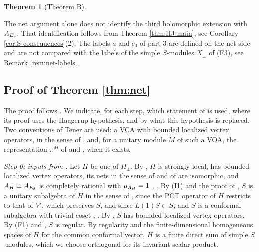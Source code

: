 \documentclass[leqno]{article}
\let\cal\relax
\newcommand{\cal}{\mathcal}
\newtheorem{thm}{Theorem}[section]
\numberwithin{equation}{section}
\begin{document}
\begin{thm}[Theorem B]
\begin{enumerate}
\end{enumerate}
\end{thm}

The net argument alone does not identify the third holomorphic extension with $\cal A_{E_8}$. That identification follows from Theorem \ref{thm:HJ-main}, see Corollary \ref{cor:S-consequences}(2). The labels $a$ and $c_0$ of part 3 are defined on the net side and are not compared with the labels of the simple $S$-modules $X_\pm$ of (F3), see Remark \ref{rem:net-labels}.


\subsection{Proof of Theorem \ref{thm:net}}

The proof follows \cite[Sections 5--7]{ArhII}. We indicate, for each step, which statement of \cite{ArhII} is used, where its proof uses the Haagerup hypothesis, and by what this hypothesis is replaced. Two conventions of Tener are used: a VOA with bounded localized vertex operators, in the sense of \cite[Definition 4.12 p.~42]{Ten19}, and, for a unitary module $M$ of such a VOA, the representation $\pi^M$ of \cite[Definition 5.1 p.~49]{Ten19} and \cite[Definition 2.18 p.~20]{Ten24}, when it exists.

\emph{Step 0: inputs from \cite[Section 4]{ArhII}.} Let $H$ be one of $H_\pm$. By \cite[Proposition 4.3(1)]{ArhII}, $H$ is strongly local, has bounded localized vertex operators, its nets in the sense of \cite{Ten19} and of \cite{CKLW18} are isomorphic, and $\cal A_H \cong \cal A_{E_8}$ is completely rational with $\mu_{\cal A_H} = 1$ \cite[Theorem 7.4 p.~71, Proposition 7.5 and Corollary 7.7 p.~72]{Ten19}, \cite[Corollary 3.19]{DoX06}. By (I1) and the proof of \cite[Theorem 4.5]{ArhII}, $S$ is a unitary subalgebra of $H$ in the sense of \cite[Definition 2.3 p.~12]{Ten19}, since the PCT operator of $H$ restricts to that of $V'$, which preserves $S$, and since $L(1)S \subset S$, and $S$ is a conformal subalgebra with trivial coset \cite[Proposition 2.7]{Ten19}, \cite[Remark 5.30]{CKLW18}. By \cite[Proposition 4.16 p.~43]{Ten19}, $S$ has bounded localized vertex operators. By (F1) and \cite[Theorem 4.5 p.~9]{ABD04}, $S$ is regular. By regularity and the finite-dimensional homogeneous spaces of $H$ for the common conformal vector, $H$ is a finite direct sum of simple $S$-modules, which we choose orthogonal for its invariant scalar product.
\end{document}
